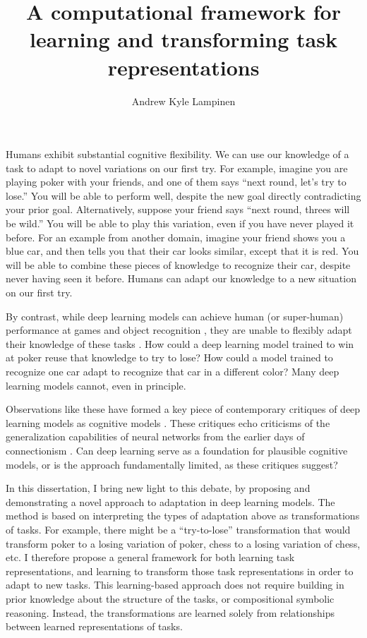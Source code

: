 \documentclass[12pt]{article}
\title{A computational framework for learning and transforming task representations}
\author{Andrew Kyle Lampinen}
\date{}
\renewcommand{\headrulewidth}{0pt}
\begin{document}
\maketitle
\thispagestyle{firststyle}

Humans exhibit substantial cognitive flexibility. We can use our knowledge of a task to adapt to novel variations on our first try. For example, imagine you are playing poker with your friends, and one of them says ``next round, let's try to lose.'' You will be able to perform well, despite the new goal directly contradicting your prior goal. Alternatively, suppose your friend says ``next round, threes will be wild.'' You will be able to play this variation, even if you have never played it before. For an example from another domain, imagine your friend shows you a blue car, and then tells you that their car looks similar, except that it is red. You will be able to combine these pieces of knowledge to recognize their car, despite never having seen it before. Humans can adapt our knowledge to a new situation on our first try. 

By contrast, while deep learning models can achieve human (or super-human) performance at games \citep{Silver2017,Vinyals2019} and object recognition \citep{Szegedy2016}, they are unable to flexibly adapt their knowledge of these tasks \citep{Lake2016}. How could a deep learning model trained to win at poker reuse that knowledge to try to lose? How could a model trained to recognize one car adapt to recognize that car in a different color? Many deep learning models cannot, even in principle.  

Observations like these have formed a key piece of contemporary critiques of deep learning models as cognitive models \citep{Lake2016,Marcus2018}. These critiques echo criticisms of the generalization capabilities of neural networks from the earlier days of connectionism \citep{Fodor1988}. Can deep learning serve as a foundation for plausible cognitive models, or is the approach fundamentally limited, as these critiques suggest? 

In this dissertation, I bring new light to this debate, by proposing and demonstrating a novel approach to adaptation in deep learning models. The method is based on interpreting the types of adaptation above as transformations of tasks. For example, there might be a ``try-to-lose'' transformation that would transform poker to a losing variation of poker, chess to a losing variation of chess, etc. I therefore propose a general framework for both learning task representations, and learning to transform those task representations in order to adapt to new tasks. This learning-based approach does not require building in prior knowledge about the structure of the tasks, or compositional symbolic reasoning. Instead, the transformations are learned solely from relationships between learned representations of tasks. 
\renewcommand{\headrulewidth}{0.4pt}
\end{document}
